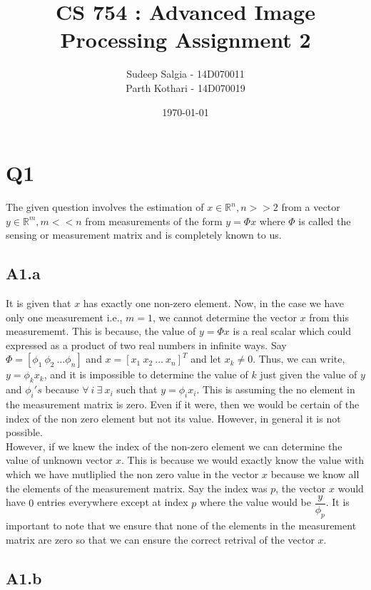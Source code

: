 \documentclass{article}
\title{CS 754 : Advanced Image Processing Assignment 2}
\author{Sudeep Salgia - 14D070011\\
  Parth Kothari - 14D070019\\
}
\date{\today}
\begin{document}
\maketitle

\section*{Q1}

The given question involves the estimation of $x \in \mathbb{R}^n , n >> 2 $ from a vector $y \in \mathbb{R}^m , m << n $ from measurements of the form $ y = \Phi x $ where $ \Phi $ is called the sensing or measurement matrix and is completely known to us.

\subsection*{A1.a}

It is given that $ x $ has exactly one non-zero element. Now, in the case we have only one measurement i.e., $ m = 1 $, we cannot determine the vector $ x $ from this measurememt. This is because, the value of $y = \Phi x $ is a real scalar which could expressed as a product of two real numbers in infinite ways. Say $ \Phi = [ \phi_1 \ \phi_2 \ \dots \phi_n] $ and $ x = [x_1 \  x_2 \ \dots \ x_n]^T $ and let $ x_k \neq 0 $. Thus, we can write, $ y = \phi_k x_k $, and it is impossible to determine the value of $ k $ just given the value of $y$ and $\phi_i 's$ because $ \forall \ i \ \exists \ x_i $ such that $ y = \phi_i x_i $. This is assuming the no element in the measurement matrix is zero. Even if it were, then we would be certain of the index of the non zero element but not its value. However, in general it is not possible. \\

However, if we knew the index of the non-zero element we can determine the value of unknown vector $x$. This is because we would exactly know the value with which we have mutliplied the non zero value in the vector $x$ because we know all the elements of the measurement matrix. Say the index was $p$, the vector $x$ would have $0$ entries everywhere except at index $p$ where the value would be $\dfrac{y}{\phi_p} $. It is important to note that we ensure that none of the elements in the measurement matrix are zero so that we can ensure the correct retrival of the vector $x$.

\subsection*{A1.b}
\end{document}
